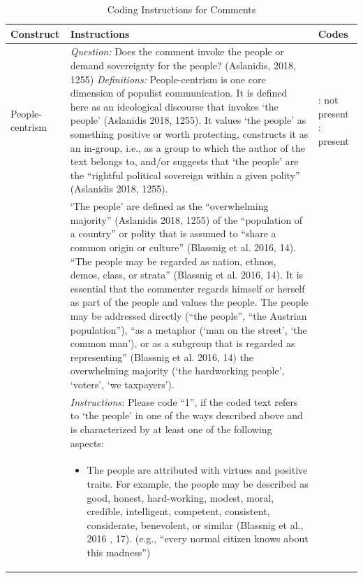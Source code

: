 \documentclass[
]{ccr}
\begin{document}
{
\begin{spacing}{1}
\fontsize{8}{9}\selectfont 
\begin{longtable}[]{@{}
  >{\raggedright\arraybackslash}p{.14\linewidth}
  >{\raggedright\arraybackslash}p{.62\linewidth}
  >{\raggedright\arraybackslash}p{.13\linewidth}@{}}
\caption{Coding Instructions for Comments} \\
\toprule\noalign{}
\textbf{Construct} & \textbf{Instructions} & \textbf{Codes} \\
\midrule\noalign{}
\endhead
\endlastfoot
People-centrism & 
\emph{Question:} \newline Does the comment invoke the people or demand sovereignty for the people? (Aslanidis, 2018, 1255) \newline \newline
\emph{Definitions:} \newline People-centrism is one core dimension of populist communication. It is defined here as an ideological discourse that invokes ‘the people’ (Aslanidis 2018, 1255). It values ‘the people’ as something positive or worth protecting, constructs it as an in-group, i.e., as a group to which the author of the text belongs to, and/or suggests that ‘the people’ are the “rightful political sovereign within a given polity” (Aslanidis 2018, 1255).
& 
0: not present \newline
1: present
\\
& ‘The people’ are defined as the “overwhelming majority” (Aslanidis 2018, 1255) of the “population of a country” or polity that is assumed to “share a common origin or culture” (Blassnig et al. 2016, 14). “The people may be regarded as nation, ethnos, demos, class, or strata” (Blassnig et al. 2016, 14). It is essential that the commenter regards himself or herself as part of the people and values the people. The people may be addressed directly (“the people”, “the Austrian population”), “as a metaphor (‘man on the street’, ‘the common man’), or as a subgroup that is regarded as representing” (Blassnig et al. 2016, 14) the overwhelming majority (‘the hardworking people’, ‘voters’, ‘we taxpayers’). & 
\\
&
\emph{Instructions:} \newline
Please code “1”, if the coded text refers to ‘the people’ in one of the ways described above and is characterized by at least one of the following aspects: \newline
&
\\
&
\begin{itemize}
\item The people are attributed with virtues and positive traits. For example, the people may be described as good, honest, hard-working, modest, moral, credible, intelligent, competent, consistent, considerate, benevolent, or similar (Blassnig et al., 2016 , 17). (e.g., “every normal citizen knows about this madness”)

\end{itemize}
\end{longtable}
\end{spacing}}
\end{document}
